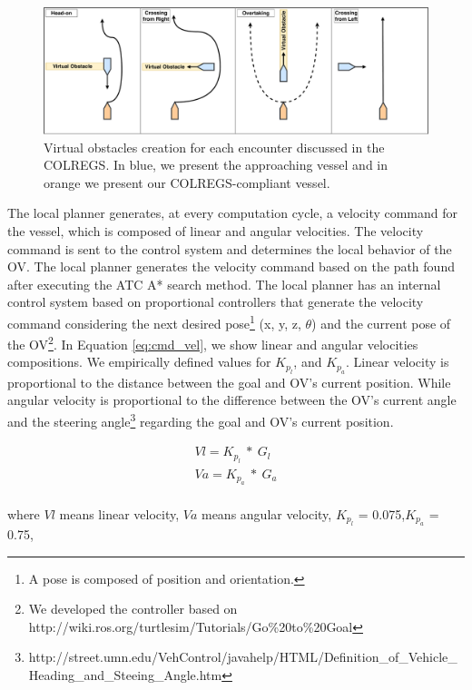             \begin{figure}[H]
                \centering
                \includegraphics[scale=0.32]{figs/Chap4/atc.pdf}
                \caption{Virtual obstacles creation for each encounter discussed in the \ac{COLREGS}. In blue, we present the approaching vessel and in orange we present our \ac{COLREGS}-compliant vessel.
                }
                \label{fig:atc}
            \end{figure}

            The local planner generates, at every computation cycle, a velocity command for the vessel, which is composed of linear and angular velocities. The velocity command is sent to the control system and determines the local behavior of the \ac{OV}. The local planner generates the velocity command based on the path found after executing the \ac{ATC} A* search method. The local planner has an internal control system based on proportional controllers that generate the velocity command considering the next desired pose\footnote{A pose is composed of position and orientation.} (x, y, z, $\theta$) and the current pose of the \ac{OV}\footnote{We developed the controller based on http://wiki.ros.org/turtlesim/Tutorials/Go\%20to\%20Goal}. In Equation \ref{eq:cmd_vel}, we show linear and angular velocities compositions. We empirically defined values for $K_{p_{l}}$, and $K_{p_{a}}$. Linear velocity is proportional to the distance between the goal and \ac{OV}'s current position. While angular velocity is proportional to the difference between the \ac{OV}'s current angle and the steering angle\footnote{http://street.umn.edu/VehControl/javahelp/HTML/Definition\_of\_Vehicle\_Heading\_and\_Steeing\_Angle.htm} regarding the goal and \ac{OV}'s current position.
            
            \begin{equation}
            \label{eq:cmd_vel}
            \begin{split}
                Vl = K_{p_{l}}\ *\ G_{l} \\
                Va = K_{p_{a}}\ *\ G_{a}
            \end{split}
            \end{equation}
            \\
            where $Vl$ means linear velocity, $Va$ means angular velocity, $K_{p_{l}}$ = 0.075,$K_{p_{a}}$ = 0.75, 
            
